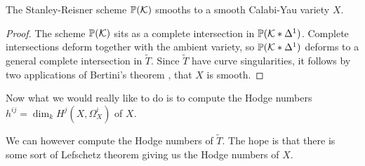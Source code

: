 \documentclass[11pt, english]{article}
\begin{document}
\begin{corr}
The Stanley-Reisner scheme $\mathbb{P}(\mathcal K)$ smooths to a smooth Calabi-Yau variety $X$.
\end{corr}
\begin{proof}
The scheme $\mathbb{P}(\mathcal K)$ sits as a complete intersection in $\mathbb{P}(\mathcal K \ast \Delta^1)$. Complete intersections deform together with the ambient variety, so $\mathbb{P}(\mathcal K \ast \Delta^1)$ deforms to a general complete intersection in $\widetilde T$. Since $\widetilde T$ have curve singularities, it follows by two applications of Bertini's theorem \cite[Theorem II.8.18]{hartshorne}, that $X$ is smooth.
\end{proof}

Now what we would really like to do is to compute the Hodge numbers $h^{ij}=\dim_k H^j(X,\Omega^i_X)$ of $X$. 

We can however compute the Hodge numbers of $\widetilde T$. The hope is that there is some sort of Lefschetz theorem giving us the Hodge numbers of $X$.
\end{document}
